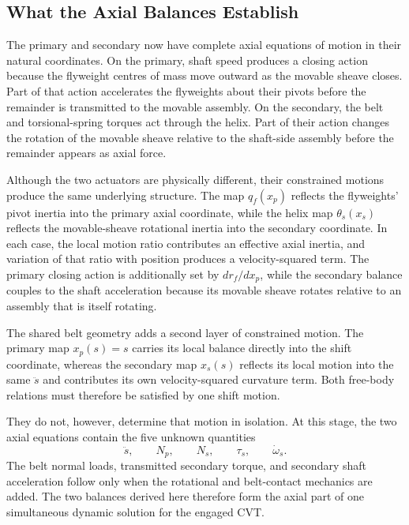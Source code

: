 \documentclass[11pt]{report}
\numberwithin{equation}{section}
\begin{document}


\subsection{What the Axial Balances Establish}
\label{sec:axial_balance_synthesis}

The primary and secondary now have complete axial equations of motion in
their natural coordinates. On the primary, shaft speed produces a closing
action because the flyweight centres of mass move outward as the movable
sheave closes. Part of that action accelerates the flyweights about their
pivots before the remainder is transmitted to the movable assembly. On the
secondary, the belt and torsional-spring torques act through the helix. Part
of their action changes the rotation of the movable sheave relative to the
shaft-side assembly before the remainder appears as axial force.

Although the two actuators are physically different, their constrained
motions produce the same underlying structure. The map \(q_f(x_p)\) reflects
the flyweights' pivot inertia into the primary axial coordinate, while the
helix map \(\theta_s(x_s)\) reflects the movable-sheave rotational inertia into
the secondary coordinate. In each case, the local motion ratio contributes
an effective axial inertia, and variation of that ratio with position
produces a velocity-squared term. The primary closing action is additionally
set by \(dr_f/dx_p\), while the secondary balance couples to the shaft
acceleration because its movable sheave rotates relative to an assembly that
is itself rotating.

The shared belt geometry adds a second layer of constrained motion. The
primary map \(x_p(s)=s\) carries its local balance directly into the shift
coordinate, whereas the secondary map \(x_s(s)\) reflects its local motion
into the same \(\ddot{s}\) and contributes its own velocity-squared curvature
term. Both free-body relations must therefore be satisfied by one shift
motion.

They do not, however, determine that motion in isolation. At this stage, the
two axial equations contain the five unknown quantities
\[
    \ddot{s},
    \qquad N_p,
    \qquad N_s,
    \qquad \tau_s,
    \qquad \dot{\omega}_s.
\]
The belt normal loads, transmitted secondary torque, and secondary shaft
acceleration follow only when the rotational and belt-contact mechanics are
added. The two balances derived here therefore form the axial part of one
simultaneous dynamic solution for the engaged CVT.
\end{document}
